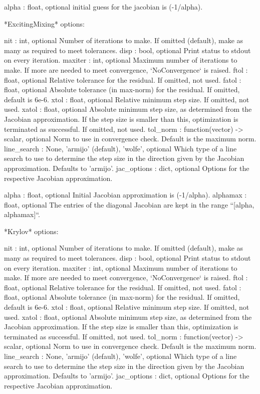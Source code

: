 \begin{DoxyVerb}
        alpha : float, optional
            initial guess for the jacobian is (-1/alpha).

*ExcitingMixing* options:

    nit : int, optional
        Number of iterations to make. If omitted (default), make as many
        as required to meet tolerances.
    disp : bool, optional
        Print status to stdout on every iteration.
    maxiter : int, optional
        Maximum number of iterations to make. If more are needed to
        meet convergence, `NoConvergence` is raised.
    ftol : float, optional
        Relative tolerance for the residual. If omitted, not used.
    fatol : float, optional
        Absolute tolerance (in max-norm) for the residual.
        If omitted, default is 6e-6.
    xtol : float, optional
        Relative minimum step size. If omitted, not used.
    xatol : float, optional
        Absolute minimum step size, as determined from the Jacobian
        approximation. If the step size is smaller than this, optimization
        is terminated as successful. If omitted, not used.
    tol_norm : function(vector) -> scalar, optional
        Norm to use in convergence check. Default is the maximum norm.
    line_search : {None, 'armijo' (default), 'wolfe'}, optional
        Which type of a line search to use to determine the step size in
        the direction given by the Jacobian approximation. Defaults to
        'armijo'.
    jac_options : dict, optional
        Options for the respective Jacobian approximation.

        alpha : float, optional
            Initial Jacobian approximation is (-1/alpha).
        alphamax : float, optional
            The entries of the diagonal Jacobian are kept in the range
            ``[alpha, alphamax]``.

*Krylov* options:

    nit : int, optional
        Number of iterations to make. If omitted (default), make as many
        as required to meet tolerances.
    disp : bool, optional
        Print status to stdout on every iteration.
    maxiter : int, optional
        Maximum number of iterations to make. If more are needed to
        meet convergence, `NoConvergence` is raised.
    ftol : float, optional
        Relative tolerance for the residual. If omitted, not used.
    fatol : float, optional
        Absolute tolerance (in max-norm) for the residual.
        If omitted, default is 6e-6.
    xtol : float, optional
        Relative minimum step size. If omitted, not used.
    xatol : float, optional
        Absolute minimum step size, as determined from the Jacobian
        approximation. If the step size is smaller than this, optimization
        is terminated as successful. If omitted, not used.
    tol_norm : function(vector) -> scalar, optional
        Norm to use in convergence check. Default is the maximum norm.
    line_search : {None, 'armijo' (default), 'wolfe'}, optional
        Which type of a line search to use to determine the step size in
        the direction given by the Jacobian approximation. Defaults to
        'armijo'.
    jac_options : dict, optional
        Options for the respective Jacobian approximation.


\end{DoxyVerb}
